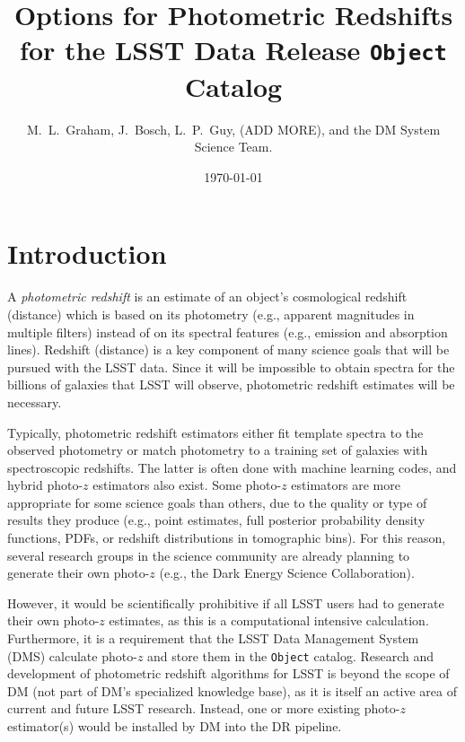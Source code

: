 \documentclass[DM,lsstdraft,toc]{lsstdoc}
\title[Photo-$z$ for LSST Objects]{Options for Photometric Redshifts for the LSST Data Release {\tt Object} Catalog}
\author{M.~L.~Graham, J.~Bosch, L.~P.~Guy, (ADD MORE), and the DM System Science Team.}
\date{\today}
\begin{document}
\maketitle




\section{Introduction} \label{sec:intro}

A {\it photometric redshift} is an estimate of an object's cosmological redshift (distance) which is based on its photometry (e.g., apparent magnitudes in multiple filters) instead of on its spectral features (e.g., emission and absorption lines). 
Redshift (distance) is a key component of many science goals that will be pursued with the LSST data.
Since it will be impossible to obtain spectra for the billions of galaxies that LSST will observe, photometric redshift estimates will be necessary.

Typically, photometric redshift estimators either fit template spectra to the observed photometry or match photometry to a training set of galaxies with spectroscopic redshifts. 
The latter is often done with machine learning codes, and hybrid photo-$z$ estimators also exist. 
Some photo-$z$ estimators are more appropriate for some science goals than others, due to the quality or type of results they produce (e.g., point estimates, full posterior probability density functions, PDFs, or redshift distributions in tomographic bins).
For this reason, several research groups in the science community are already planning to generate their own photo-$z$ (e.g., the Dark Energy Science Collaboration).

However, it would be scientifically prohibitive if all LSST users had to generate their own photo-$z$ estimates, as this is a computational intensive calculation.
Furthermore, it is a requirement that the LSST Data Management System (DMS) calculate photo-$z$ and store them in the {\tt Object} catalog.
Research and development of photometric redshift algorithms for LSST is beyond the scope of DM (not part of DM's specialized knowledge base), as it is itself an active area of current and future LSST research.
Instead, one or more existing photo-$z$ estimator(s) would be installed by DM into the DR pipeline.
\end{document}
